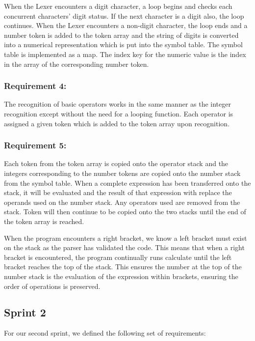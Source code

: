 \documentclass[a4paper, oneside, 11pt]{report}
\begin{document}
When the Lexer encounters a digit character, a loop begins and checks each concurrent characters’ digit status. If the next character is a digit also, the loop continues. When the Lexer encounters a non-digit character, the loop ends and a number token is added to the token array and the string of digits is converted into a numerical representation which is put into the symbol table. The symbol table is implemented as a map. The index key for the numeric value is the index in the array of the corresponding number token. 

\subsubsection{Requirement 4: }

The recognition of basic operators works in the same manner as the integer recognition except without the need for a looping function. Each operator is assigned a given token which is added to the token array upon recognition. 

\subsubsection{Requirement 5: }

Each token from the token array is copied onto the operator stack and the integers corresponding to the number tokens are copied onto the number stack from the symbol table. When a complete expression has been transferred onto the stack, it will be evaluated and the result of that expression with replace the operands used on the number stack. Any operators used are removed from the stack. Token will then continue to be copied onto the two stacks until the end of the token array is reached.  

When the program encounters a right bracket, we know a left bracket must exist on the stack as the parser has validated the code. This means that when a right bracket is encountered, the program continually runs calculate until the left bracket reaches the top of the stack. This ensures the number at the top of the number stack is the evaluation of the expression within brackets, ensuring the order of operations is preserved. 

\subsection{Sprint 2}

For our second sprint, we defined the following set of requirements: 
\end{document}
